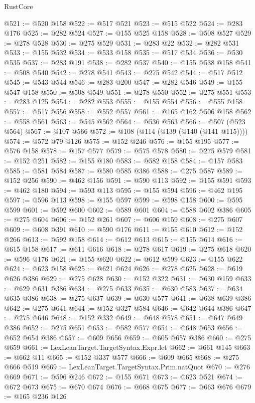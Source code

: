 \begin{lexlean}{RustCore}
\begin{coremodule}
@521 := @520 @158
@522 := @517 @521
@523 := @515 @522
@524 := @283 @176
@525 := @282 @524
@527 := @155 @525 @158
@528 := @508 @527
@529 := @278 @528
@530 := @275 @529
@531 := @283 @22
@532 := @282 @531
@533 := @155 @532
@534 := @533 @158
@535 := @517 @534
@536 := @530 @535
@537 := @283 @191
@538 := @282 @537
@540 := @155 @538 @158
@541 := @508 @540
@542 := @278 @541
@543 := @275 @542
@544 := @517 @512
@545 := @543 @544
@546 := @283 @200
@547 := @282 @546
@549 := @155 @547 @158
@550 := @508 @549
@551 := @278 @550
@552 := @275 @551
@553 := @283 @125
@554 := @282 @553
@555 := @155 @554
@556 := @555 @158
@557 := @517 @556
@558 := @552 @557
@561 := @165 @162 @506 @158
@562 := @558 @561
@563 := @545 @562
@564 := @536 @563
@566 := @507 (@523 @564)
@567 := @107 @566
@572 := @108 (@114 (@139 (@140 (@141 @115))))
@574 := @572 @79 @126
@575 := @152 @246
@576 := @155 @195
@577 := @576 @158
@578 := @157 @577
@579 := @575 @578
@580 := @275 @579
@581 := @152 @251
@582 := @155 @180
@583 := @582 @158
@584 := @157 @583
@585 := @581 @584
@587 := @580 @585 @386
@588 := @275 @587
@589 := @152 @256
@590 := @462 @156
@591 := @590 @113
@592 := @155 @591
@593 := @462 @180
@594 := @593 @113
@595 := @155 @594
@596 := @462 @195
@597 := @596 @113
@598 := @155 @597
@599 := @598 @158
@600 := @595 @599
@601 := @592 @600
@602 := @589 @601
@604 := @588 @602 @386
@605 := @275 @604
@606 := @152 @261
@607 := @606 @159
@608 := @275 @607
@609 := @608 @391
@610 := @590 @176
@611 := @155 @610
@612 := @152 @266
@613 := @592 @158
@614 := @612 @613
@615 := @155 @614
@616 := @615 @158
@617 := @611 @616
@618 := @278 @617
@619 := @275 @618
@620 := @596 @176
@621 := @155 @620
@622 := @612 @599
@623 := @155 @622
@624 := @623 @158
@625 := @621 @624
@626 := @278 @625
@628 := @619 @626 @386
@629 := @275 @628
@630 := @152 @322
@631 := @630 @159
@633 := @629 @631 @386
@634 := @275 @633
@635 := @630 @583
@637 := @634 @635 @386
@638 := @275 @637
@639 := @630 @577
@641 := @638 @639 @386
@642 := @275 @641
@644 := @152 @327 @584
@646 := @642 @644 @386
@647 := @275 @646
@648 := @152 @332
@649 := @648 @578
@651 := @647 @649 @386
@652 := @275 @651
@653 := @582 @577
@654 := @648 @653
@656 := @652 @654 @386
@657 := @609 @656
@659 := @605 @657 @386
@660 := @275 @659
@661 := LexLeanTarget.TargetSyntax.Expr.let
@662 := @661 @145
@663 := @662 @11
@665 := @152 @337 @577
@666 := @609 @665
@668 := @275 @666 @519
@669 := LexLeanTarget.TargetSyntax.Prim.natQuot
@670 := @276 @669
@671 := @596 @246
@672 := @155 @671
@673 := @623 @521
@674 := @672 @673
@675 := @670 @674
@676 := @668 @675
@677 := @663 @676
@679 := @165 @236 @126

\end{coremodule}
\end{lexlean}
